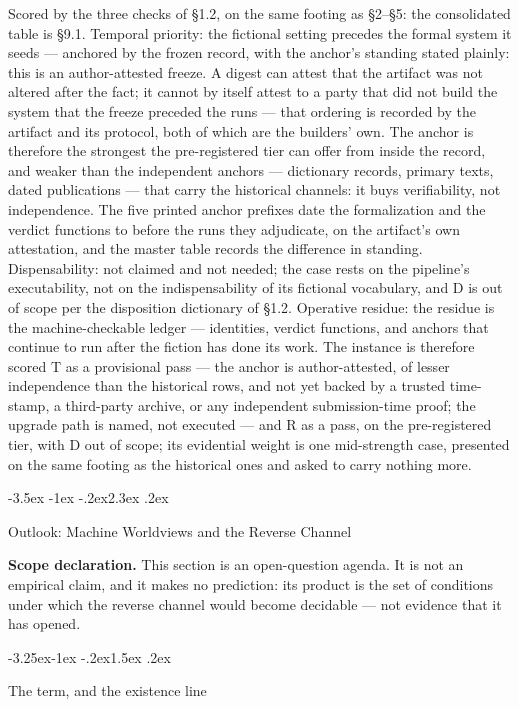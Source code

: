 \documentclass[11pt,a4paper]{article}
\makeatletter
\renewcommand\section{\@startsection{section}{1}{\z@}%
  {-3.5ex \@plus -1ex \@minus -.2ex}{2.3ex \@plus .2ex}%
  {\normalfont\Large\bfseries\raggedright}}
\renewcommand\subsection{\@startsection{subsection}{2}{\z@}%
  {-3.25ex\@plus -1ex \@minus -.2ex}{1.5ex \@plus .2ex}%
  {\normalfont\large\bfseries\raggedright}}
\makeatother
\begin{document}
Scored by the three checks of §1.2, on the same footing as §2–§5: the consolidated table is §9.1. Temporal priority: the fictional setting precedes the formal system it seeds — anchored by the frozen record, with the anchor's standing stated plainly: this is an author-attested freeze. A digest can attest that the artifact was not altered after the fact; it cannot by itself attest to a party that did not build the system that the freeze preceded the runs — that ordering is recorded by the artifact and its protocol, both of which are the builders' own. The anchor is therefore the strongest the pre-registered tier can offer from inside the record, and weaker than the independent anchors — dictionary records, primary texts, dated publications — that carry the historical channels: it buys verifiability, not independence. The five printed anchor prefixes date the formalization and the verdict functions to before the runs they adjudicate, on the artifact's own attestation, and the master table records the difference in standing. Dispensability: not claimed and not needed; the case rests on the pipeline's executability, not on the indispensability of its fictional vocabulary, and D is out of scope per the disposition dictionary of §1.2. Operative residue: the residue is the machine-checkable ledger — identities, verdict functions, and anchors that continue to run after the fiction has done its work. The instance is therefore scored T as a provisional pass — the anchor is author-attested, of lesser independence than the historical rows, and not yet backed by a trusted time-stamp, a third-party archive, or any independent submission-time proof; the upgrade path is named, not executed — and R as a pass, on the pre-registered tier, with D out of scope; its evidential weight is one mid-strength case, presented on the same footing as the historical ones and asked to carry nothing more.

\section{Outlook: Machine Worldviews and the Reverse Channel}

\textbf{Scope declaration.} This section is an open-question agenda. It is not an empirical claim, and it makes no prediction: its product is the set of conditions under which the reverse channel would become decidable — not evidence that it has opened.

\subsection{The term, and the existence line}
\end{document}
